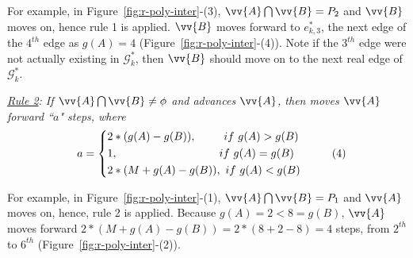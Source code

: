 For example, in Figure~\ref{fig:r-poly-inter}-(3), $\vv{A} \bigcap \vv{B} = P_2$ and $\vv{B}$ moves on, hence rule 1 is applied. $\vv{B}$ moves forward to $e^*_{k, 3}$, \ie the next edge of the $4^{th}$ edge as $g(A) = 4$ (Figure~\ref{fig:r-poly-inter}-(4)).
Note if the $3^{th}$ edge were not actually existing in $\mathcal{G}^*_k$, then $\vv{B}$ should move on to the next real edge of $\mathcal{G}^*_k$.


\vspace{1ex}
\ni \emph{\underline{Rule 2}:
If $\vv{A} \bigcap \vv{B} \ne \phi$ and advances $\vv{A}$, then moves $\vv{A}$ forward ``$a$" steps, where}
\begin{equation*}
\label{equ-rule2}
\small
    \hspace{2ex} a =  \left\{
    \begin{aligned}
        & 2*(g(A) - g(B)),  \hspace{5ex} ~if  ~g(A) > g(B) \\
        & {1},              \hspace{20.5ex}~if  ~g(A) = g(B) \\
        & 2*(M+g(A) - g(B)), ~if  ~g(A) < g(B) \\
    \end{aligned}
    \right.       \hspace{6ex}(4)
\end{equation*}


For example, in Figure~\ref{fig:r-poly-inter}-(1), $\vv{A} \bigcap \vv{B} = P_1$ and $\vv{A}$ moves on, hence, rule 2 is applied. Because $g(A)=2 < 8=g(B)$, $\vv{A}$ moves forward $2*(M+g(A) - g(B)) = 2*(8+2-8)= 4$ steps, \ie from $2^{th}$ to $6^{th}$ (Figure~\ref{fig:r-poly-inter}-(2)).


